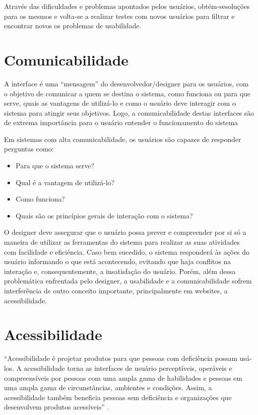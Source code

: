 Através das dificuldades e problemas apontados pelos usuários, obtém-sesoluções para os mesmos e volta-se a realizar testes com novos usuários para filtrar e encontrar novos os problemas de usabilidade.

\section{Comunicabilidade}
\label{Comunicabilidade}
A interface é uma “mensagem” do desenvolvedor/designer para os usuários, com o objetivo de comunicar a quem se destina o sistema, como funciona ou para que serve, quais as vantagens de utilizá-lo e como o usuário deve interagir com o sistema para atingir seus objetivos. Logo, a comunicabilidade destas interfaces são de extrema importância para o usuário entender o funcionamento do sistema \cite{normanDAODESIGNDODIA}

Em sistemas com alta comunicabilidade, os usuários são capazes de responder perguntas como:
\begin{itemize}
    \item Para que o sistema serve?
    \item Qual é a vantagem de utilizá-lo?
    \item Como funciona?
    \item Quais são os princípios gerais de interação com o sistema?
\end{itemize}

O designer deve assegurar que o usuário possa prever e compreender por si só a maneira de utilizar as ferramentas do sistema para realizar as suas atividades com facilidade e eficiência. Caso bem sucedido, o sistema responderá às ações do usuário informando o que está acontecendo, evitando que haja conflitos na interação e, consequentemente, a insatisfação do usuário. Porém, além dessa problemática enfrentada pelo designer, a usabilidade e a comunicabilidade sofrem interferência de outro conceito importante, principalmente em websites, a acessibilidade. 

\section{Acessibilidade}
\label{Acessibilidade}

 \begin{citacao}
 “Acessibilidade é projetar produtos para que pessoas com deficiência possam usá-los. A acessibilidade torna as interfaces de usuário perceptíveis, operáveis e compreensíveis por pessoas com uma ampla gama de habilidades e pessoas em uma ampla gama de circunstâncias, ambientes e condições. Assim, a acessibilidade também beneficia pessoas sem deficiência e organizações que desenvolvem produtos acessíveis” \cite{slhjustask}.
\end{citacao}

